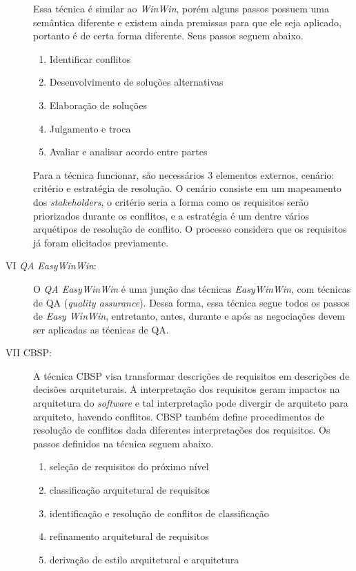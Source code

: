 \begin{description}
Essa técnica é similar ao \textit{WinWin}, porém alguns passos possuem uma
semântica diferente e existem ainda premissas para que ele seja aplicado, portanto é de
certa forma diferente. Seus passos seguem abaixo.
 
 \begin{enumerate}
\item Identificar conflitos
\item Desenvolvimento de soluções alternativas
\item Elaboração de soluções
\item Julgamento e troca
\item Avaliar e analisar acordo entre partes
 \end{enumerate}

Para a técnica funcionar, são necessários 3 elementos externos, cenário:
critério e estratégia de resolução. O cenário consiste em um mapeamento dos
\textit{stakeholders}, o critério seria a forma como os requisitos serão
priorizados durante os conflitos, e a estratégia é um dentre vários arquétipos de resolução
de conflito.  O processo considera que os requisitos já foram elicitados
previamente.

\item [VI \textit{QA EasyWinWin}:]

O \textit{QA EasyWinWin} é uma junção das técnicas \textit{EasyWinWin}, com
técnicas de QA (\textit{quality assurance}). Dessa forma, essa técnica segue
todos os passos de \textit{Easy WinWin}, entretanto, antes, durante e após as
negociações devem ser aplicadas as técnicas de QA.

\item [VII CBSP:]

A técnica CBSP visa transformar descrições de requisitos em descrições de
decisões arquiteturais. A interpretação dos requisitos geram impactos na
arquitetura do \textit{software} e tal interpretação pode divergir de arquiteto
para arquiteto, havendo conflitos. CBSP também define procedimentos de resolução de conflitos dada diferentes interpretações dos requisitos. Os passos definidos na técnica seguem abaixo.

 \begin{enumerate}
\item seleção de requisitos do próximo nível
\item classificação arquitetural de requisitos
\item identificação e resolução de conflitos de classificação
\item refinamento arquitetural de requisitos
\item derivação de estilo arquitetural e arquitetura
 \end{enumerate}
 

\end{description}
